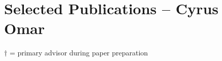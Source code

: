 \documentclass[10pt,letterpaper]{article}
\renewenvironment{itemize}{
  \begin{list}{}{
    \setlength{\leftmargin}{1.25em}
    \setlength{\itemsep}{0.25em}
    \setlength{\parskip}{0pt}
    \setlength{\parsep}{0.2em}
  }
}{
  \end{list}
}
\begin{document}
\section*{Selected Publications -- Cyrus Omar}
\newcommand{\advisee}[1]{#1$^\dagger$}
$\dagger$ = primary advisor during paper preparation

\begin{enumerate}[leftmargin=*, labelindent=6.5em, font=\bfseries]

\end{enumerate}
\end{document}

